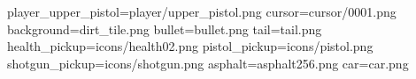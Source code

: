 player_upper_pistol=player/upper_pistol.png
cursor=cursor/0001.png
background=dirt_tile.png
bullet=bullet.png
tail=tail.png
health_pickup=icons/health02.png
pistol_pickup=icons/pistol.png
shotgun_pickup=icons/shotgun.png
asphalt=asphalt256.png
car=car.png
